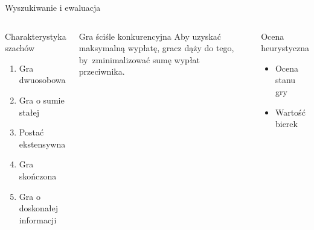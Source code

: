 \begin{frame}{Wyszukiwanie i ewaluacja}
    \begin{columns}
        \begin{block}{Charakterystyka szachów}
            \begin{enumerate}
                \item Gra dwuosobowa
                \item Gra o sumie stałej
                \item Postać ekstensywna
                \item Gra skończona
                \item Gra o doskonałej informacji
            \end{enumerate}

        \end{block}

        \begin{alertblock} {Gra ściśle konkurencyjna}
            Aby uzyskać maksymalną wypłatę, gracz dąży do tego, by~zminimalizować sumę wypłat
            przeciwnika.
        \end{alertblock}



        \begin{block}{Ocena heurystyczna}
            \begin{itemize}
                \item Ocena stanu gry
                \item Wartość bierek
            \end{itemize}
        \end{block}

    \end{columns}
\end{frame}